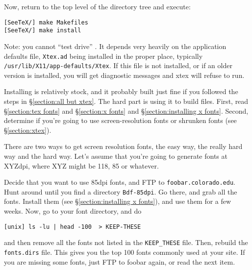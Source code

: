 Now, return to the top level of the directory tree and execute:

\begin{verbatim}
[SeeTeX/] make Makefiles
[SeeTeX/] make install
\end{verbatim}

Note: you cannot ``test drive'' {\xtex}. It depends very heavily on the
application defaults file, {\tt Xtex.ad} being installed in the proper place,
typically {\tt /usr/lib/X11/app-defaults/Xtex}. If this file is not installed,
or if an older version is installed, you will get diagnostic messages
and xtex will refuse to run.


Installing {\mftobdf} is relatively stock, and it probably built just
fine if you followed the steps in \S\ref{section:all but xtex}.
The hard part is using it to build {\BDF} files.
First, read \S\ref{section:tex fonts} and \S\ref{section:x fonts}
and \S\ref{section:installing x fonts}.
Second, determine if you're going to use screen-resolution fonts
or shrunken fonts (see \S\ref{section:xtex}).


There are two ways to get screen resolution fonts,
the easy way, the really hard way and the hard way.
Let's assume that you're going to generate fonts at XYZdpi, where
XYZ might be 118, 85 or whatever.


Decide that you want to use 85dpi fonts, and FTP to 
\verb|foobar.colorado.edu|. Hunt around until you find a directory
\verb|Bdf-85dpi|. Go there, and grab all the fonts. Install them
(see \S\ref{section:installing x fonts}), and use them for a few
weeks. Now, go to your font directory, and do
\begin{verbatim}
[unix] ls -lu | head -100  > KEEP-THESE  
\end{verbatim}
and then remove all the fonts not listed in the \verb|KEEP_THESE| file.
Then, rebuild the \verb|fonts.dirs| file.
This gives you the top 100 fonts commonly used at your site.
If you are missing some fonts, just FTP to foobar again, or read the
next item.


